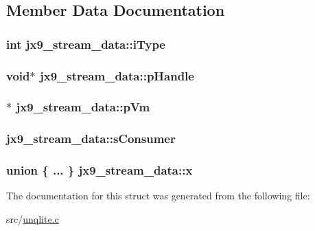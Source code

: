 \subsection{Member Data Documentation}
\hypertarget{structjx9__stream__data_ac49e5d1107b6f543ac74c895535b5624}{
\subsubsection[{i\-Type}]{\setlength{\rightskip}{0pt plus 5cm}int jx9\-\_\-stream\-\_\-data\-::i\-Type}}\label{d0/df3/structjx9__stream__data_ac49e5d1107b6f543ac74c895535b5624}
\hypertarget{structjx9__stream__data_a12ce65cc5f443551bb6b005f985896ba}{
\subsubsection[{p\-Handle}]{\setlength{\rightskip}{0pt plus 5cm}void$\ast$ jx9\-\_\-stream\-\_\-data\-::p\-Handle}}\label{d0/df3/structjx9__stream__data_a12ce65cc5f443551bb6b005f985896ba}
\hypertarget{structjx9__stream__data_a8318805380a33e5b75027b98e5baadbb}{
\subsubsection[{p\-Vm}]{$\ast$ jx9\-\_\-stream\-\_\-data\-::p\-Vm}}\label{d0/df3/structjx9__stream__data_a8318805380a33e5b75027b98e5baadbb}
\hypertarget{structjx9__stream__data_a56682842fd5931f437036c616b4c9350}{
\subsubsection[{s\-Consumer}]{ jx9\-\_\-stream\-\_\-data\-::s\-Consumer}}\label{d0/df3/structjx9__stream__data_a56682842fd5931f437036c616b4c9350}
\hypertarget{structjx9__stream__data_ab5237e1607c2925675cdc0cb869ac0fe}{
\subsubsection[{x}]{\setlength{\rightskip}{0pt plus 5cm}union \{ ... \}  jx9\-\_\-stream\-\_\-data\-::x}}\label{d0/df3/structjx9__stream__data_ab5237e1607c2925675cdc0cb869ac0fe}


The documentation for this struct was generated from the following file\-:\begin{DoxyCompactItemize}
\item 
src/\hyperlink{unqlite_8c}{unqlite.\-c}\end{DoxyCompactItemize}
